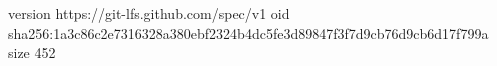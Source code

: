 version https://git-lfs.github.com/spec/v1
oid sha256:1a3c86c2e7316328a380ebf2324b4dc5fe3d89847f3f7d9cb76d9cb6d17f799a
size 452
